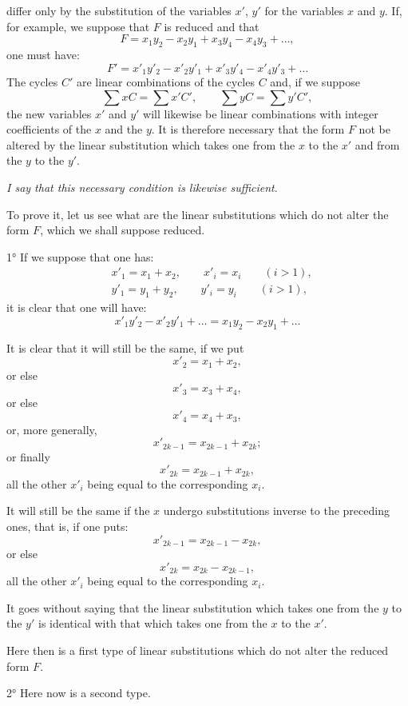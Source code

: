 \documentclass{article}
\begin{document}
differ only by the substitution of the variables $x'$, $y'$ for the variables $x$ and $y$. If, for example, we suppose that $F$ is reduced and that
\[ F = x_{1}y_{2} - x_{2}y_{1} + x_{3}y_{4} - x_{4}y_{3} + \ldots, \]
one must have:
\[ F' = x'_{1}y'_{2} - x'_{2}y'_{1} + x'_{3}y'_{4} - x'_{4}y'_{3} + \ldots \]
The cycles $C'$ are linear combinations of the cycles $C$ and, if we suppose
\[ \sum x C = \sum x' C', \qquad \sum y C = \sum y' C', \]
the new variables $x'$ and $y'$ will likewise be linear combinations with integer coefficients of the $x$ and the $y$. It is therefore necessary that the form $F$ not be altered by the linear substitution which takes one from the $x$ to the $x'$ and from the $y$ to the $y'$.

\emph{I say that this necessary condition is likewise sufficient}.

To prove it, let us see what are the linear substitutions which do not alter the form $F$, which we shall suppose reduced.

1° If we suppose that one has:
\[ \begin{aligned} &x'_{1} = x_{1} + x_{2}, \qquad x'_{i} = x_{i} \qquad (i > 1),\\ &y'_{1} = y_{1} + y_{2}, \qquad y'_{i} = y_{i} \qquad (i > 1), \end{aligned} \]
it is clear that one will have:
\[ x'_{1}y'_{2} - x'_{2}y'_{1} + \ldots = x_{1}y_{2} - x_{2}y_{1} + \ldots \]

It is clear that it will still be the same, if we put
\[ x'_{2} = x_{1} + x_{2}, \]
or else
\[ x'_{3} = x_{3} + x_{4}, \]
or else
\[ x'_{4} = x_{4} + x_{3}, \]
or, more generally,
\[ x'_{2k-1} = x_{2k-1} + x_{2k}; \]
or finally
\[ x'_{2k} = x_{2k-1} + x_{2k}, \]
all the other $x'_{i}$ being equal to the corresponding $x_{i}$.

It will still be the same if the $x$ undergo substitutions inverse to the preceding ones, that is, if one puts:
\[ x'_{2k-1} = x_{2k-1} - x_{2k}, \]
or else
\[ x'_{2k} = x_{2k} - x_{2k-1}, \]
all the other $x'_{i}$ being equal to the corresponding $x_{i}$.


It goes without saying that the linear substitution which takes one from the $y$ to the $y'$ is identical with that which takes one from the $x$ to the $x'$.

Here then is a first type of linear substitutions which do not alter the reduced form $F$.

2° Here now is a second type.
\end{document}
